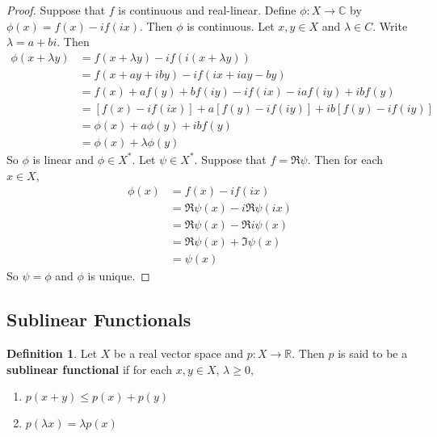 \documentclass[12pt]{amsart}
\theoremstyle{definition}
\newtheorem{defn}[definition]{Definition}
\newcommand{\lam}{\lambda}
\newcommand{\C}{\mathbb{C}}
\newcommand{\R}{\mathbb{R}}
\newcommand{\tbf}[1]{\textbf{#1}}
\DeclareMathOperator*{\0}{\mbf{0}}
\DeclareMathOperator*{\1}{\mbf{1}}
\newcommand{\ld}[1]{\label{defn:#1}}
\begin{document}
	\begin{proof}
		Suppose that $f$ is continuous and real-linear. Define $\phi:X \rightarrow \C$ by $\phi(x) = f(x) -if(ix)$. Then $\phi$ is continuous. Let $x,y \in X$ and $\lam \in C$. Write $\lam = a + bi$. Then 
		\begin{align*}
			\phi(x + \lam y)
			&= f(x + \lam y) -if(i(x + \lam y)) \\
			&= f(x + ay + i by) -if(ix + iay - by) \\
			&= f(x) + af(y) + bf(iy) - if(ix) - iaf(iy) +ibf(y) \\
			&= [f(x) - if(ix)] + a[f(y) - if(iy)] + ib[f(y) -if(iy)] \\
			&= \phi(x) + a\phi(y) +ibf(y) \\
			&= \phi(x) + \lam \phi(y) 
		\end{align*}
	So $\phi$ is linear and $\phi \in X^*$. Let $\psi \in X^*$. Suppose that $f = \Re \psi$. 
	Then for each $x \in X$,
	\begin{align*}
		\phi(x) 
		&= f(x) - if(ix) \\
		&= \Re \psi(x) -i \Re \psi(ix) \\
		&= \Re \psi(x) - \Re i\psi(x) \\
		&= \Re \psi(x) + \Im \psi(x) \\
		&= \psi(x)
	\end{align*} 
	So $\psi = \phi$ and $\phi$ is unique.
	\end{proof}


	





















	
	\newpage	
	\subsection{Sublinear Functionals}
	
	\begin{defn} \ld{55003}
		Let $X$ be a real vector space and $p:X \rightarrow \R$. Then $p$ is said to be a \tbf{sublinear functional} if for each $x,y \in X$, $\lam \geq 0$, 
		\begin{enumerate}
			\item $p(x+y) \leq p(x) + p(y)$
			\item $p(\lam x ) = \lam p(x)$
		\end{enumerate}  
	\end{defn}
	
\end{document}
